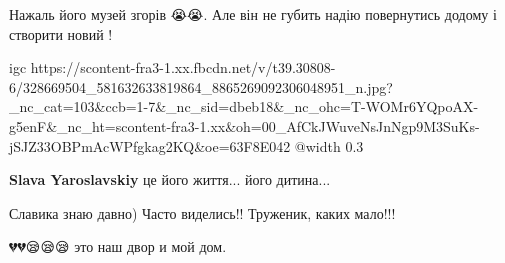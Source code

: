  
 
 
 
 

\qqSecCmt


Нажаль його музей згорів 😭😭. Але він не губить надію повернутись додому і
створити новий !


\ifcmt
  igc https://scontent-fra3-1.xx.fbcdn.net/v/t39.30808-6/328669504_581632633819864_8865269092306048951_n.jpg?_nc_cat=103&ccb=1-7&_nc_sid=dbeb18&_nc_ohc=T-WOMr6YQpoAX-g5enF&_nc_ht=scontent-fra3-1.xx&oh=00_AfCkJWuveNsJnNgp9M3SuKs-jSJZ33OBPmAcWPfgkag2KQ&oe=63F8E042
	@width 0.3
\fi

\begin{itemize} %
\textbf{Slava Yaroslavskiy} це його життя... його дитина...
\end{itemize} %


Славика знаю давно) Часто виделись!! Труженик, каких мало!!!


💔💔😪😪😪 это наш двор и мой дом.
